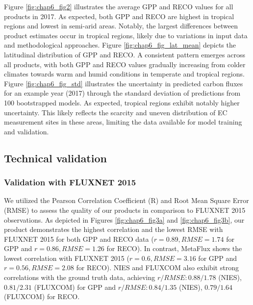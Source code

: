 Figure \ref{fig:chap6_fig2} illustrates the average GPP and RECO values for all products in 2017. As expected, both GPP and RECO are highest in tropical regions and lowest in semi-arid areas. Notably, the largest differences between product estimates occur in tropical regions, likely due to variations in input data and methodological approaches. Figure \ref{fig:chap6_fig_lat_mean} depicts the latitudinal distribution of GPP and RECO. A consistent pattern emerges across all products, with both GPP and RECO values gradually increasing from colder climates towards warm and humid conditions in temperate and tropical regions. Figure \ref{fig:chap6_fig_std} illustrates the uncertainty in predicted carbon fluxes for an example year (2017) through the standard deviation of predictions from 100 bootstrapped models. As expected, tropical regions exhibit notably higher uncertainty. This likely reflects the scarcity and uneven distribution of EC measurement sites in these areas, limiting the data available for model training and validation. \par

\subsection{Technical validation}
\subsubsection{Validation with FLUXNET 2015}
We utilized the Pearson Correlation Coefficient (R) and Root Mean Square Error (RMSE) to assess the quality of our products in comparison to FLUXNET 2015 observations. As depicted in Figures \ref{fig:chap6_fig3a} and \ref{fig:chap6_fig3b}, our product demonstrates the highest correlation and the lowest RMSE with FLUXNET 2015 for both GPP and RECO data ($r = 0.89, RMSE = 1.74$ for GPP and $r = 0.86, RMSE = 1.26$ for RECO). In contrast, MetaFlux shows the lowest correlation with FLUXNET 2015 ($r = 0.6, RMSE = 3.16$ for GPP and $r = 0.56, RMSE = 2.08$ for RECO). NIES and FLUXCOM also exhibit strong correlations with the ground truth data, achieving $r/RMSE: 0.88/1.78$ (NIES), $0.81/2.31$ (FLUXCOM) for GPP and $r/RMSE: 0.84/1.35$ (NIES), $0.79/1.64$ (FLUXCOM) for RECO. \par

